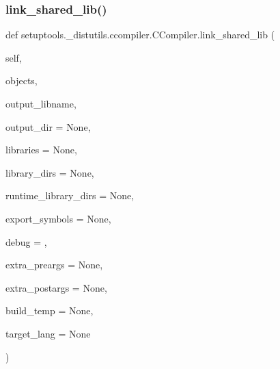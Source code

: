 \subsubsection{\texorpdfstring{link\+\_\+shared\+\_\+lib()}{link\_shared\_lib()}}
{\footnotesize\ttfamily def setuptools.\+\_\+distutils.\+ccompiler.\+C\+Compiler.\+link\+\_\+shared\+\_\+lib (\begin{DoxyParamCaption}\item[{}]{self,  }\item[{}]{objects,  }\item[{}]{output\+\_\+libname,  }\item[{}]{output\+\_\+dir = {\ttfamily None},  }\item[{}]{libraries = {\ttfamily None},  }\item[{}]{library\+\_\+dirs = {\ttfamily None},  }\item[{}]{runtime\+\_\+library\+\_\+dirs = {\ttfamily None},  }\item[{}]{export\+\_\+symbols = {\ttfamily None},  }\item[{}]{debug = {},  }\item[{}]{extra\+\_\+preargs = {\ttfamily None},  }\item[{}]{extra\+\_\+postargs = {\ttfamily None},  }\item[{}]{build\+\_\+temp = {\ttfamily None},  }\item[{}]{target\+\_\+lang = {\ttfamily None} }\end{DoxyParamCaption})}

\mbox{\label{classsetuptools_1_1__distutils_1_1ccompiler_1_1CCompiler_a477f6179a873bd6199a7f6c6114f94c6}} 
